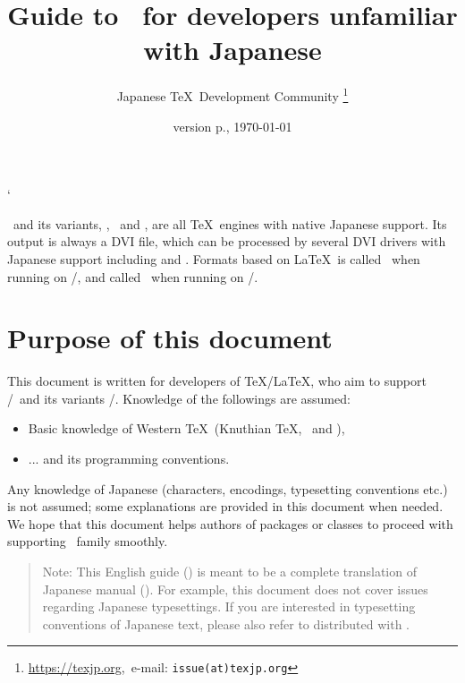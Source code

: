 \documentclass[a4paper,11pt,dvipdfmx]{article}
\let\emph=\origemph
\begin{document}
\catcode`
\title{\textsf{\textbf{Guide to \pTeX\ for developers unfamiliar with Japanese}}}
\author{Japanese \TeX\ Development Community\null
\thanks{\url{https://texjp.org},\ e-mail: \texttt{issue(at)texjp.org}}}
\date{version p\the\ptexversion.\the\ptexminorversion\ptexrevision, \today}
\maketitle

\pTeX\ and its variants, \upTeX, \epTeX\ and \eupTeX, are all \TeX\ engines
with native Japanese support.
Its output is always a DVI file, which can be processed by several
DVI drivers with Japanese support including \emph{dvips} and \emph{dvipdfmx}.
Formats based on \LaTeX\ is called \pLaTeX\ when running on \pTeX/\epTeX,
and called \upLaTeX\ when running on \upTeX/\eupTeX.

\section*{Purpose of this document}

This document is written for developers of \TeX/\LaTeX, who aim to
support \pTeX/\pLaTeX\ and its variants \upTeX/\upLaTeX.
Knowledge of the followings are assumed:
\begin{itemize}
  \item Basic knowledge of Western \TeX\ (Knuthian \TeX, \eTeX\ and \pdfTeX),
  \item ... and its programming conventions.
\end{itemize}

Any knowledge of Japanese (characters, encodings, typesetting conventions etc.)
is not assumed; some explanations are provided in this document when needed.
We hope that this document helps authors of packages or classes
to proceed with supporting \pTeX\ family smoothly.

\begin{quotation}
Note: This English guide () is \emph{not} meant
to be a complete translation of Japanese manual ().
For example, this document does not cover issues regarding Japanese typesettings.
If you are interested in typesetting conventions of Japanese text, please also
refer to  distributed with .
\end{quotation}
\end{document}
